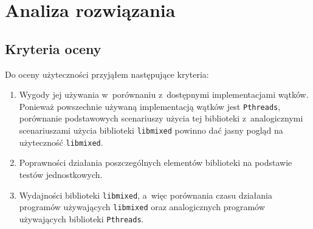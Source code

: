 \documentclass[12pt]{mwart}
\newcommand{\code}{\texttt}
\begin{document}
\section{Analiza rozwiązania}
\label{sec:analysis}
\subsection{Kryteria oceny}
\label{sec:criterions}
\indent
	Do oceny użyteczności przyjąłem następujące kryteria:
	\begin{enumerate}
		\item Wygody jej używania w~porównaniu z~dostępnymi implementacjami wątków. Ponieważ powszechnie używaną implementacją wątków jest \code{Pthreads},
      porównanie podstawowych scenariuszy użycia tej biblioteki z~analogicznymi scenariuszami użycia biblioteki \code{libmixed} powinno dać jasny pogląd
      na użyteczność \code{libmixed}.
    \item Poprawności działania poszczególnych elementów biblioteki na podstawie testów jednostkowych.
		\item Wydajności biblioteki \code{libmixed}, a~więc porównania czasu działania programów używających \code{libmixed}
      oraz analogicznych programów używających biblioteki \code{Pthreads}.
	\end{enumerate}
\par
%
\end{document}
